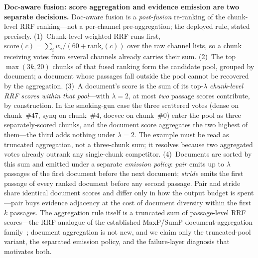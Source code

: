 \documentclass[sigconf,nonacm]{acmart}
\begin{document}
\textbf{Doc-aware fusion: score aggregation and evidence emission are two
separate decisions.} Doc-aware fusion is a \emph{post-fusion} re-ranking
of the chunk-level RRF ranking---not a per-channel pre-aggregation; the
deployed rule, stated precisely. (1)~Chunk-level weighted RRF runs
first, $\mathrm{score}(c)=\sum_i w_i/(60+\mathrm{rank}_i(c))$ over the
raw channel lists, so a chunk receiving votes from several channels
already carries their sum. (2)~The top $\max(3k,20)$ chunks of that
fused ranking form the candidate pool, grouped by document; a document
whose passages fall outside the pool cannot be recovered by the
aggregation. (3)~A document's score is the sum of its top-$\lambda$
\emph{chunk-level RRF scores within that pool}---with $\lambda{=}2$, at
most \emph{two} passage scores contribute, by construction. In the
smoking-gun case the three scattered votes (dense on chunk~\#47, synq
on chunk~\#4, docvec on chunk~\#0) enter the pool as three
separately-scored chunks, and the document score aggregates the two
highest of them---the third adds nothing under $\lambda{=}2$. The
example must be read as truncated aggregation, not a three-chunk sum;
it resolves because two aggregated votes already outrank any
single-chunk competitor. (4)~Documents are sorted by this sum and
emitted under a separate \emph{emission policy}: \emph{pair} emits up
to $\lambda$ passages of the first document before the next document;
\emph{stride} emits the first passage of every ranked document before
any second passage. Pair and stride share identical document scores and
differ only in how the output budget is spent---pair buys evidence
adjacency at the cost of document diversity within the first $k$
passages. The aggregation rule itself is a truncated sum of
passage-level RRF scores---the RRF analogue of the established
MaxP/SumP document-aggregation family~\cite{maxp}; document aggregation
is not new, and we claim only the truncated-pool variant, the separated
emission policy, and the failure-layer diagnosis that motivates both.
\end{document}
